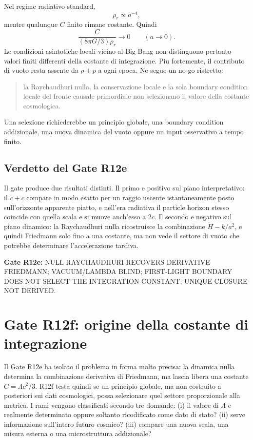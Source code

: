 \documentclass[11pt,a4paper]{article}
\newcommand{\status}[1]{\textsf{#1}}
\begin{document}
Nel regime radiativo standard,
\begin{equation}
 \rho_r\propto a^{-4},
\end{equation}
mentre qualunque $C$ finito rimane costante. Quindi
\begin{equation}
 \frac{C}{(8\pi G/3)\rho_r}\longrightarrow0
 \qquad (a\to0).
 \label{eq:r12e_early_constant_hidden}
\end{equation}
Le condizioni asintotiche locali vicino al Big Bang non distinguono pertanto valori finiti differenti della costante di integrazione. Piu fortemente, il contributo di vuoto resta assente da $\rho+p$ a ogni epoca. Ne segue un no-go ristretto:
\begin{quote}
la Raychaudhuri nulla, la conservazione locale e la sola boundary condition locale del fronte causale primordiale non selezionano il valore della costante cosmologica.
\end{quote}
Una selezione richiederebbe un principio globale, una boundary condition addizionale, una nuova dinamica del vuoto oppure un input osservativo a tempo finito.

\subsection{Verdetto del Gate R12e}

Il gate produce due risultati distinti. Il primo e positivo sul piano interpretativo: il $c+c$ compare in modo esatto per un raggio uscente istantaneamente posto sull'orizzonte apparente piatto, e nell'era radiativa il particle horizon stesso coincide con quella scala e si muove anch'esso a $2c$. Il secondo e negativo sul piano dinamico: la Raychaudhuri nulla ricostruisce la combinazione $\dot H-k/a^2$, e quindi Friedmann solo fino a una costante, ma non vede il settore di vuoto che potrebbe determinare l'accelerazione tardiva.

\textbf{Gate R12e:} \status{NULL RAYCHAUDHURI RECOVERS DERIVATIVE FRIEDMANN; VACUUM/LAMBDA BLIND; FIRST-LIGHT BOUNDARY DOES NOT SELECT THE INTEGRATION CONSTANT; UNIQUE CLOSURE NOT DERIVED}.

\section{Gate R12f: origine della costante di integrazione}

Il Gate R12e ha isolato il problema in forma molto precisa: la dinamica nulla determina la combinazione derivativa di Friedmann, ma lascia libera una costante $C=\Lambda c^2/3$. R12f testa quindi se un principio globale, ma non costruito a posteriori sui dati cosmologici, possa selezionare quel settore proporzionale alla metrica. I rami vengono classificati secondo tre domande: (i) il valore di $\Lambda$ e realmente determinato oppure soltanto ricodificato come dato di stato? (ii) serve informazione sull'intero futuro cosmico? (iii) compare una nuova scala, una misura esterna o una microstruttura addizionale?
\end{document}
